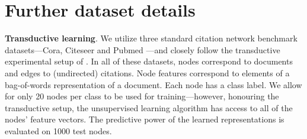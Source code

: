 \documentclass{article} \usepackage{iclr2019_conference,times}
\newtheorem{lemma}{Lemma}
\newcommand{\xhdr}[1]{{\noindent\bfseries #1}.}
\begin{document}
\begin{comment}
\begin{lemma}
Let $\{{\bf X}^{(k)}\}_{k = 1}^{|{\bf X}|}$ be a set of node representations drawn from an empirical probability distribution of graphs, $p({\bf X})$, with finite number of elements, $|{\bf X}|$, such that $p({\bf X}^{(k)}) = p({\bf X}^{(k')}) \ \forall k, k'$.
Let $\mathcal{S}(\cdot)$ be a deterministic function on graphs and $\vec{s} = \mathcal{S}({\bf X})$ be the summary vector with marginal distribution $p(\vec{s})$.
The optimal classifier between a balanced mixture between the joint distribution $p({\bf X}, \vec{s})$ and the product of marginals $p({\bf X})p(\vec{s})$ has an error rate of $\mathrm{Err} = \frac{1}{2} \sum_{k=1}^{|{\bf X}|} p(\vec{s}^{(k)})^2$.
\label{lemma}
\end{lemma}
\begin{proof}
As $\mathcal{S}(\cdot)$ is deterministic, samples from the joint, $({\bf X}^{(k)}, \vec{s}^{(k)})$ are drawn from the product of marginals with probability $p(\vec{s}^{(k)}) p({\bf X}^{(k)}) =  p(\vec{s}^{(k)}) \sum_{k'} p({\bf X}^{(k)}, \vec{s}^{(k')}) = \sum_{k'} \delta_{k, k'} p(\vec{s}^{(k')}) = p(\vec{s}^{(k)}) p(\vec{s}^{(k)}) = p(\vec{s}^{(k)})^2$, where $\delta$ is the Dirac delta.
The probability of drawing any sample of the joint from the product of marginals is then $\sum_{k=1}^{|{\bf X}|} p(\vec{s}^{(k)})^2$. 
As the probability of drawing $({\bf X}^{(k)}, \vec{s}^{(k)})$ from the joint is $p(\vec{s}^{(k)})$, we know that classifying these samples as coming from the joint has a lower error than classifying them as coming from the product of marginals.
The error rate of such a classifier then is the probability of drawing a sample from the joint as a sample from product of marginals under the mixture probability, or $\mathrm{Err} = \frac{1}{2} \sum_{k=1}^{|{\bf X}|} p(\vec{s}^{(k)})^2$.
\end{proof}
\end{comment}




\appendix

\section{Further dataset details}\label{app:data}

\xhdr{Transductive learning}
We utilize three standard citation network benchmark datasets---Cora, Citeseer and Pubmed \citep{sen2008collective}---and closely follow the transductive experimental setup of \cite{yang2016revisiting}. In all of these datasets, nodes correspond to documents and edges to (undirected) citations. Node features correspond to elements of a bag-of-words representation of a document. Each node has a class label. We allow for only 20 nodes per class to be used for training---however, honouring the transductive setup, the unsupervised learning algorithm has access to all of the nodes' feature vectors. The predictive power of the learned representations is evaluated on 1000 test nodes.
\end{document}

